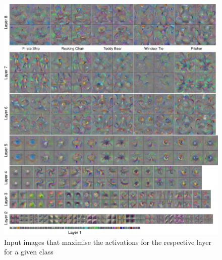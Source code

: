 \documentclass[11pt]{article}
\begin{document}
\begin{figure}[tbh]
	\centering
	\includegraphics[width=0.8\linewidth, keepaspectratio]{img/deepvis_all_layers}
	\caption{Input images that maximise the activations for the respective layer for a given class}
	\label{fig:deepvisalllayers}
\end{figure}
\end{document}
